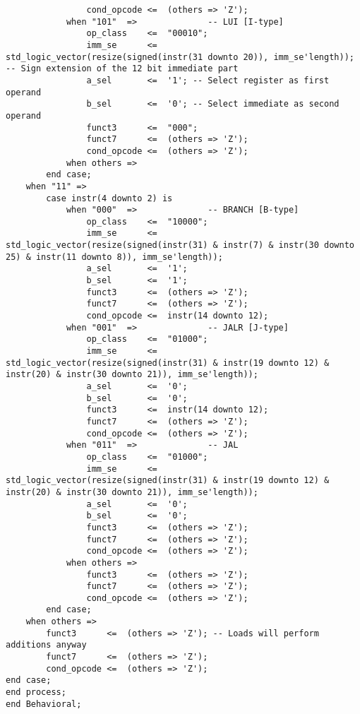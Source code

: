 \begin{code}
\begin{verbatim}
                cond_opcode <=  (others => 'Z'); 
            when "101"  =>              -- LUI [I-type]
                op_class    <=  "00010";
                imm_se      <=  std_logic_vector(resize(signed(instr(31 downto 20)), imm_se'length)); -- Sign extension of the 12 bit immediate part 
                a_sel       <=  '1'; -- Select register as first operand 
                b_sel       <=  '0'; -- Select immediate as second operand
                funct3      <=  "000";
                funct7      <=  (others => 'Z'); 
                cond_opcode <=  (others => 'Z');                       
            when others =>
        end case;    
    when "11" =>
        case instr(4 downto 2) is 
            when "000"  =>              -- BRANCH [B-type]
                op_class    <=  "10000";
                imm_se      <=  std_logic_vector(resize(signed(instr(31) & instr(7) & instr(30 downto 25) & instr(11 downto 8)), imm_se'length));
                a_sel       <=  '1';
                b_sel       <=  '1';
                funct3      <=  (others => 'Z'); 
                funct7      <=  (others => 'Z'); 
                cond_opcode <=  instr(14 downto 12); 
            when "001"  =>              -- JALR [J-type]
                op_class    <=  "01000";
                imm_se      <=  std_logic_vector(resize(signed(instr(31) & instr(19 downto 12) & instr(20) & instr(30 downto 21)), imm_se'length));
                a_sel       <=  '0';
                b_sel       <=  '0';
                funct3      <=  instr(14 downto 12);
                funct7      <=  (others => 'Z'); 
                cond_opcode <=  (others => 'Z'); 
            when "011"  =>              -- JAL
                op_class    <=  "01000";
                imm_se      <=  std_logic_vector(resize(signed(instr(31) & instr(19 downto 12) & instr(20) & instr(30 downto 21)), imm_se'length));
                a_sel       <=  '0';
                b_sel       <=  '0'; 
                funct3      <=  (others => 'Z'); 
                funct7      <=  (others => 'Z'); 
                cond_opcode <=  (others => 'Z');                      
            when others =>
                funct3      <=  (others => 'Z'); 
                funct7      <=  (others => 'Z'); 
                cond_opcode <=  (others => 'Z');  
        end case;   
    when others =>
        funct3      <=  (others => 'Z'); -- Loads will perform additions anyway
        funct7      <=  (others => 'Z'); 
        cond_opcode <=  (others => 'Z');  
end case;
end process;
end Behavioral;
\end{verbatim}
\end{code}


